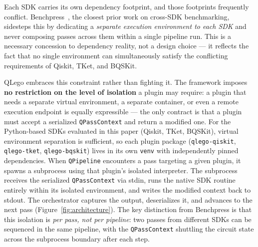 \documentclass[conference]{IEEEtran}
\begin{document}
Each SDK carries its own dependency footprint, and those footprints frequently conflict.
Benchpress~\cite{benchpress}, the closest prior work on cross-SDK benchmarking, sidesteps this by dedicating a \emph{separate execution environment to each SDK} and never composing passes across them within a single pipeline run.
This is a necessary concession to dependency reality, not a design choice — it reflects the fact that no single environment can simultaneously satisfy the conflicting requirements of Qiskit, TKet, and BQSKit.

QLego embraces this constraint rather than fighting it.
The framework imposes \textbf{no restriction on the level of isolation} a plugin may require: a plugin that needs a separate virtual environment, a separate container, or even a remote execution endpoint is equally expressible — the only contract is that a plugin must accept a serialized \texttt{QPassContext} and return a modified one.
For the Python-based SDKs evaluated in this paper (Qiskit, TKet, BQSKit), virtual environment separation is sufficient, so each plugin package (\texttt{qlego-qiskit}, \texttt{qlego-tket}, \texttt{qlego-bqskit}) lives in its own \texttt{venv} with independently pinned dependencies.
When \texttt{QPipeline} encounters a pass targeting a given plugin, it spawns a subprocess using that plugin's isolated interpreter.
The subprocess receives the serialized \texttt{QPassContext} via stdin, runs the native SDK routine entirely within its isolated environment, and writes the modified context back to stdout.
The orchestrator captures the output, deserializes it, and advances to the next pass (Figure~\ref{fig:architecture}).
The key distinction from Benchpress is that this isolation is \emph{per pass, not per pipeline}: two passes from different SDKs can be sequenced in the same pipeline, with the \texttt{QPassContext} shuttling the circuit state across the subprocess boundary after each step.
\end{document}
